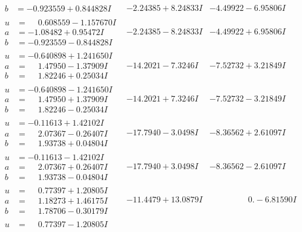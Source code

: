 \documentclass[1p]{elsarticle_modified}
\theoremstyle{definition}
\begin{document}
$$\begin{array}{c|c|c}
\begin{aligned}
b &= -0.923559 + 0.844828 I\end{aligned}
 & -2.24385 + 8.24833 I & -4.49922 - 6.95806 I \\ \hline\begin{aligned}
u &= \phantom{-}0.608559 - 1.157670 I \\
a &= -1.08482 + 0.95472 I \\
b &= -0.923559 - 0.844828 I\end{aligned}
 & -2.24385 - 8.24833 I & -4.49922 + 6.95806 I \\ \hline\begin{aligned}
u &= -0.640898 + 1.241650 I \\
a &= \phantom{-}1.47950 - 1.37909 I \\
b &= \phantom{-}1.82246 + 0.25034 I\end{aligned}
 & -14.2021 - 7.3246 I & -7.52732 + 3.21849 I \\ \hline\begin{aligned}
u &= -0.640898 - 1.241650 I \\
a &= \phantom{-}1.47950 + 1.37909 I \\
b &= \phantom{-}1.82246 - 0.25034 I\end{aligned}
 & -14.2021 + 7.3246 I & -7.52732 - 3.21849 I \\ \hline\begin{aligned}
u &= -0.11613 + 1.42102 I \\
a &= \phantom{-}2.07367 - 0.26407 I \\
b &= \phantom{-}1.93738 + 0.04804 I\end{aligned}
 & -17.7940 - 3.0498 I & -8.36562 + 2.61097 I \\ \hline\begin{aligned}
u &= -0.11613 - 1.42102 I \\
a &= \phantom{-}2.07367 + 0.26407 I \\
b &= \phantom{-}1.93738 - 0.04804 I\end{aligned}
 & -17.7940 + 3.0498 I & -8.36562 - 2.61097 I \\ \hline\begin{aligned}
u &= \phantom{-}0.77397 + 1.20805 I \\
a &= \phantom{-}1.18273 + 1.46175 I \\
b &= \phantom{-}1.78706 - 0.30179 I\end{aligned}
 & -11.4479 + 13.0879 I & \phantom{-0.000000 } 0. - 6.81590 I \\ \hline\begin{aligned}
u &= \phantom{-}0.77397 - 1.20805 I \\

\end{aligned}
\end{array}$$
\end{document}
